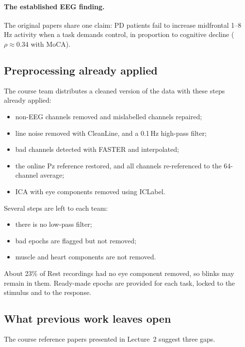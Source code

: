 \documentclass[11pt,a4paper]{article}
\begin{document}
\paragraph{The established EEG finding.} The original papers share one claim: PD patients fail to increase midfrontal 1--8\,Hz activity when a task demands control, in proportion to cognitive decline ($\rho \approx 0.34$ with MoCA).

\subsection{Preprocessing already applied}

The course team distributes a cleaned version of the data with these steps already applied:
\begin{itemize}
  \item non-EEG channels removed and mislabelled channels repaired;
  \item line noise removed with CleanLine, and a 0.1\,Hz high-pass filter;
  \item bad channels detected with FASTER and interpolated;
  \item the online Pz reference restored, and all channels re-referenced to the 64-channel average;
  \item ICA with eye components removed using ICLabel.
\end{itemize}

\noindent Several steps are left to each team:
\begin{itemize}
  \item there is no low-pass filter;
  \item bad epochs are flagged but not removed;
  \item muscle and heart components are not removed.
\end{itemize}

\noindent About 23\% of Rest recordings had no eye component removed, so blinks may remain in them. Ready-made epochs are provided for each task, locked to the stimulus and to the response.

\subsection{What previous work leaves open}

The course reference papers presented in Lecture~2 suggest three gaps.
\end{document}
